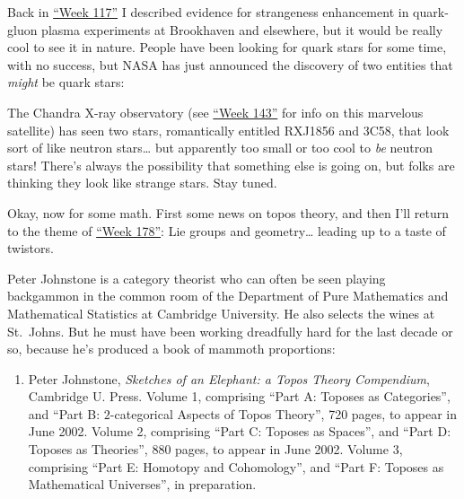 \documentclass{article}
\def\tightlist{}
\renewcommand{\texttt}[1]{%
  \begingroup
  \ttfamily
  \begingroup\lccode`~=`/\lowercase{\endgroup\def~}{/\discretionary{}{}{}}%
  \begingroup\lccode`~=`[\lowercase{\endgroup\def~}{[\discretionary{}{}{}}%
  \begingroup\lccode`~=`.\lowercase{\endgroup\def~}{.\discretionary{}{}{}}%
  \catcode`/=\active\catcode`[=\active\catcode`.=\active
  \scantokens{#1\noexpand}%
  \endgroup
}
\begin{document}
Back in \protect\hyperlink{week117}{``Week 117''} I described evidence
for strangeness enhancement in quark-gluon plasma experiments at
Brookhaven and elsewhere, but it would be really cool to see it in
nature. People have been looking for quark stars for some time, with no
success, but NASA has just announced the discovery of two entities that
\emph{might} be quark stars:


The Chandra X-ray observatory (see \protect\hyperlink{week143}{``Week
143''} for info on this marvelous satellite) has seen two stars,
romantically entitled RXJ1856 and 3C58, that look sort of like neutron
stars\ldots{} but apparently too small or too cool to \emph{be} neutron
stars! There's always the possibility that something else is going on,
but folks are thinking they look like strange stars. Stay tuned.

Okay, now for some math. First some news on topos theory, and then I'll
return to the theme of \protect\hyperlink{week178}{``Week 178''}: Lie
groups and geometry\ldots{} leading up to a taste of twistors.

Peter Johnstone is a category theorist who can often be seen playing
backgammon in the common room of the Department of Pure Mathematics and
Mathematical Statistics at Cambridge University. He also selects the
wines at St.~Johns. But he must have been working dreadfully hard for
the last decade or so, because he's produced a book of mammoth
proportions:

\begin{enumerate}
\def\labelenumi{\arabic{enumi})}
\setcounter{enumi}{1}
\tightlist
\item
  Peter Johnstone, \emph{Sketches of an Elephant: a Topos Theory
  Compendium}, Cambridge U. Press. Volume 1, comprising ``Part A:
  Toposes as Categories'', and ``Part B: \(2\)-categorical Aspects of
  Topos Theory'', 720 pages, to appear in June 2002. Volume 2,
  comprising ``Part C: Toposes as Spaces'', and ``Part D: Toposes as
  Theories'', 880 pages, to appear in June 2002. Volume 3, comprising
  ``Part E: Homotopy and Cohomology'', and ``Part F: Toposes as
  Mathematical Universes'', in preparation.
\end{enumerate}
\end{document}
